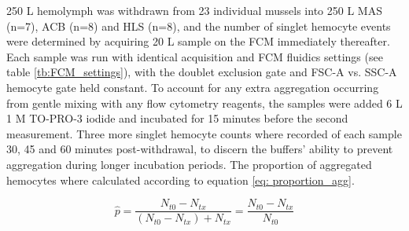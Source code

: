 250 \micro L hemolymph was withdrawn from 23 individual mussels into 250 \micro L MAS (n=7), ACB (n=8) and HLS (n=8), and the number of singlet hemocyte events were determined by acquiring 20 \micro L sample on the FCM immediately thereafter. Each sample was run with identical acquisition and FCM fluidics settings (see table \ref{tb:FCM_settings}), with the doublet exclusion gate and FSC-A vs. SSC-A hemocyte gate held constant. To account for any extra aggregation occurring from gentle mixing with any flow cytometry reagents, the samples were added 6 \micro L 1 \micro M TO-PRO-3 iodide and incubated for 15 minutes before the second measurement. Three more singlet hemocyte counts where recorded of each sample 30, 45 and 60 minutes post-withdrawal, to discern the buffers' ability to prevent aggregation during longer incubation periods. The proportion of aggregated hemocytes where calculated according to equation \ref{eq: proportion_agg}.

\begin{equation}
    \label{eq: proportion_agg}
    \hat{p} = \dfrac{N_{t0} - N_{tx}}{(N_{t0} - N_{tx}) + N_{tx}} = \dfrac{N_{t0} - N_{tx}}{N_{t0}}
\end{equation}


